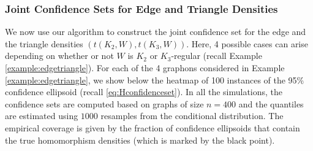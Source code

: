 \documentclass[11pt,reqno]{amsart}
\numberwithin{equation}{section}
\theoremstyle{definition}
\begin{document}
\subsubsection{Joint Confidence Sets for Edge and Triangle Densities}  


We now use our algorithm to construct the joint confidence set for the edge and the triangle densities $(t(K_2, W), t(K_3, W))$. Here, 4 possible cases can arise depending on whether or not $W$ is $K_2$ or $K_3$-regular (recall Example \ref{example:edgetriangle}). For each of the 4 graphons considered in Example \ref{example:edgetriangle}, we show below the heatmap of 100 instances of the 95\% confidence ellipsoid  (recall \eqref{eq:Hconfidenceset}). In all the simulations, the confidence sets are computed based on graphs of size $n=400$ and the quantiles are estimated using $1000$ resamples from the conditional distribution. The empirical coverage is given by the fraction of confidence ellipsoids that contain the true homomorphism densities (which is marked by the black point). 
\end{document}
